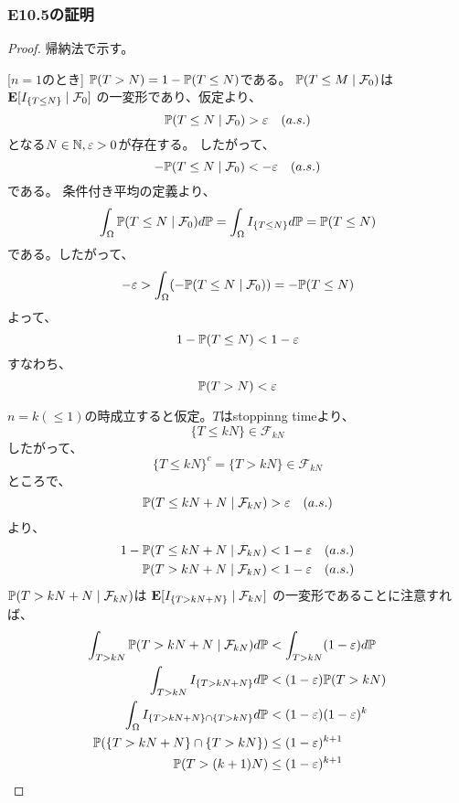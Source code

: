       \subsubsection{E10.5の証明}
        \begin{proof}
          帰納法で示す。

          [$n=1$のとき]
          ${\mathbb{P}}(T > N) = 1 - {\mathbb{P}}(T \leq N)$である。
          ${\mathbb{P}}(T \leq M \mid \mathcal{F}_0)$は
          ${\mathbf{E}}[I_{\{T \leq N\}} \mid \mathcal{F}_0]$
          の一変形であり、仮定より、
          \[
            {\mathbb{P}}(T \leq N \mid \mathcal{F}_0) >  \varepsilon \quad (a.s.)
          \]
          となる$N \in {\mathbb{N}}, \varepsilon > 0$が存在する。
          したがって、
          \[
            -{\mathbb{P}}(T \leq N \mid \mathcal{F}_0) < - \varepsilon \quad (a.s.)
          \]
          である。
          条件付き平均の定義より、
          \[
            \int_{\Omega} {\mathbb{P}}(T \leq N \mid \mathcal{F}_0) d{\mathbb{P}}
            = \int_{\Omega}I_{\{T \leq N\}}d{\mathbb{P}}
            = {\mathbb{P}}(T \leq N)
          \]
          である。したがって、
          \[
            -\varepsilon
            > \int_{\Omega}(-{\mathbb{P}}(T \leq N \mid \mathcal{F}_0))
            = -{\mathbb{P}}(T \leq N)
          \]
          よって、
          \[
            1 - {\mathbb{P}}(T \leq N) < 1 - \varepsilon
          \]
          すなわち、
          \[
            {\mathbb{P}}(T > N) < \varepsilon
          \]

          $n = k(\leq 1)$の時成立すると仮定。$T$はstoppinng timeより、
          \[
            \{T \leq kN\} \in \mathcal{F}_{kN}
          \]
          したがって、
          \[
            \{T \leq kN\}^c = \{T > kN\} \in \mathcal{F}_{kN}
          \]
          ところで、
          \[
            {\mathbb{P}}(T \leq kN + N \mid \mathcal{F}_{kN}) > \varepsilon \quad (a.s.)
          \]
          より、
          \begin{align*}
            1 - {\mathbb{P}}(T \leq kN + N \mid \mathcal{F}_{kN}) &< 1 - \varepsilon \quad (a.s.) \\
            {\mathbb{P}}(T > kN + N \mid \mathcal{F}_{kN}) &< 1 - \varepsilon \quad (a.s.)
          \end{align*}
          ${\mathbb{P}}(T > kN + N \mid \mathcal{F}_{kN})$は
          ${\mathbf{E}}[I_{\{T > kN + N\}} \mid \mathcal{F}_{kN}]$
          の一変形であることに注意すれば、
          \begin{align*}
            \int_{T > kN}{\mathbb{P}}(T > kN + N \mid \mathcal{F}_{kN})d{\mathbb{P}}
            &< \int_{T > kN}(1 - \varepsilon )d{\mathbb{P}} \\
            \int_{T > kN}I_{\{T > kN + N\}}d{\mathbb{P}}
            &< (1 - \varepsilon ){\mathbb{P}}(T > kN) \\
            \int_{\Omega} I_{\{T > kN + N\} \cap \{T > kN\}}d{\mathbb{P}}
            &< (1 - \varepsilon )(1 - \varepsilon)^k \\
            {\mathbb{P}}(\{T > kN + N\} \cap \{T > kN\})
            &\leq (1 - \varepsilon)^{k+1}\\
            {\mathbb{P}}(T > (k + 1)N)
            &\leq (1 - \varepsilon)^{k+1}\\
          \end{align*}
        \end{proof}

